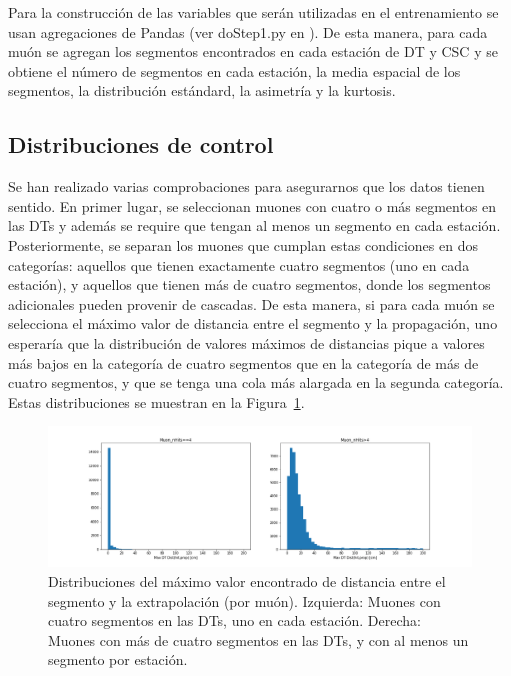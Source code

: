 Para la construcci\'on de las variables que ser\'an utilizadas en el entrenamiento se usan agregaciones de Pandas (ver doStep1.py en \cite{processor}). De esta manera, para cada mu\'on se agregan los segmentos encontrados en cada estaci\'on de DT y CSC y se obtiene el n\'umero de segmentos en cada estaci\'on, la media espacial de los segmentos, la distribuci\'on est\'andard, la asimetr\'ia y la kurtosis.



\subsection{Distribuciones de control}\label{sec:plots}

Se han realizado varias comprobaciones para asegurarnos que los datos tienen sentido. En primer lugar, se seleccionan muones con cuatro o m\'as segmentos en las DTs y adem\'as se require que tengan al menos un segmento en cada estaci\'on. Posteriormente, se separan los muones que cumplan estas condiciones en dos categor\'ias: aquellos que tienen exactamente cuatro segmentos (uno en cada estaci\'on), y aquellos que tienen m\'as de cuatro segmentos, donde los segmentos adicionales pueden provenir de cascadas. De esta manera, si para cada mu\'on se selecciona el m\'aximo valor de distancia entre el segmento y la propagaci\'on, uno esperar\'ia que la distribuci\'on de valores m\'aximos de distancias pique a valores m\'as bajos en la categor\'ia de cuatro segmentos que en la categor\'ia de m\'as de cuatro segmentos, y que se tenga una cola m\'as alargada en la segunda categor\'ia. Estas distribuciones se muestran en la Figura~\ref{fig:data_dist}. \\

\begin{figure}[h]
\centering
\includegraphics[width=1.0\textwidth]{figures/data_simple_dist_postCleaning.png}
\caption{Distribuciones del m\'aximo valor encontrado de distancia entre el segmento y la extrapolaci\'on (por mu\'on). Izquierda: Muones con cuatro segmentos en las DTs, uno en cada estaci\'on. Derecha: Muones con m\'as de cuatro segmentos en las DTs, y con al menos un segmento por estaci\'on.}
\label{fig:data_dist}        
\end{figure}


